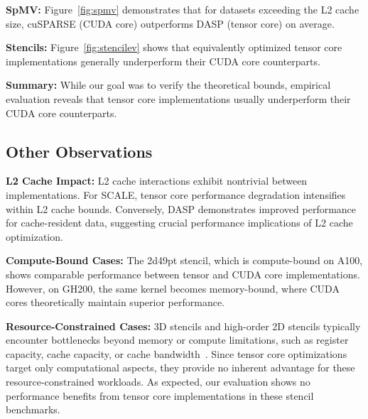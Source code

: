 \noindent\textbf{SpMV:} Figure~\ref{fig:spmv} demonstrates that for datasets exceeding the L2 cache size, cuSPARSE (CUDA core) outperforms DASP (tensor core) on average.

\noindent\textbf{Stencils:} Figure~\ref{fig:stencilev} shows that equivalently optimized tensor core implementations generally underperform their CUDA core counterparts.

\noindent\textbf{Summary:} While our goal was to verify the theoretical bounds, empirical evaluation reveals that tensor core implementations usually underperform their CUDA core counterparts.



\subsection{Other Observations}
\noindent\textbf{L2 Cache Impact:} L2 cache interactions exhibit nontrivial between implementations. For SCALE, tensor core performance degradation intensifies within L2 cache bounds. Conversely, DASP demonstrates improved performance for cache-resident data, suggesting crucial performance implications of L2 cache optimization.%

\noindent\textbf{Compute-Bound Cases:} The 2d49pt stencil, which is compute-bound on A100, shows comparable performance between tensor and CUDA core implementations. However, on GH200, the same kernel becomes memory-bound, where CUDA cores theoretically maintain superior performance.

\noindent\textbf{Resource-Constrained Cases:} 3D stencils and high-order 2D stencils typically encounter bottlenecks beyond memory or compute limitations, such as register capacity, cache capacity, or cache bandwidth~\cite{10.1145/3577193.3593716}. Since tensor core optimizations target only computational aspects, they provide no inherent advantage for these resource-constrained workloads. As expected, our evaluation shows no performance benefits from tensor core implementations in these stencil benchmarks.



